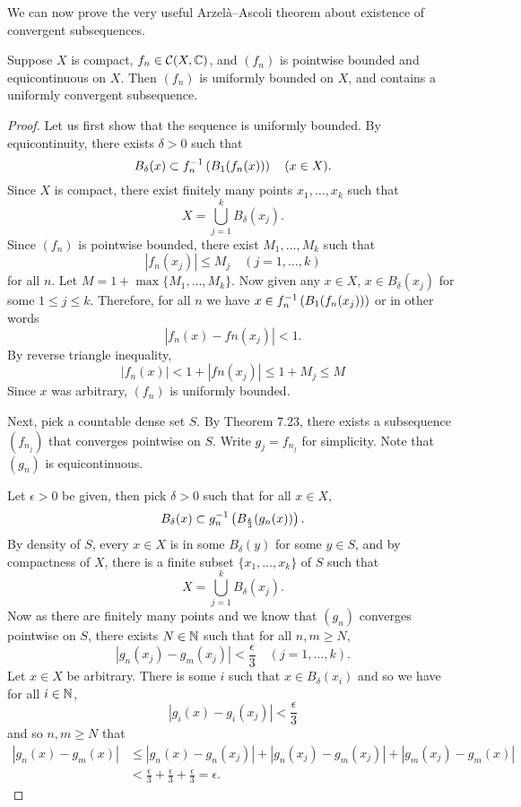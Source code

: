 We can now prove the very useful Arzel\`{a}--Ascoli theorem about existence of convergent subsequences.

\begin{theorem}
Suppose $X$ is compact, $f_n\in\mathcal{C}(X,\mathbb C)$, and $(f_n)$ is pointwise bounded and equicontinuous on $X$. Then $(f_n)$ is uniformly bounded on $X$, and contains a uniformly convergent subsequence.
\end{theorem}

\begin{proof}
Let us first show that the sequence is uniformly bounded. 
By equicontinuity, there exists $\delta>0$ such that
\[B_\delta(x)\subset f_n^{-1}\left(B_1(f_n(x))\right)\quad(x\in X).\]
Since $X$ is compact, there exist finitely many points $x_1,\dots,x_k$ such that
\[X=\bigcup_{j=1}^{k}B_\delta(x_j).\]
Since $(f_n)$ is pointwise bounded, there exist $M_1,\dots,M_k$ such that
\[|f_n(x_j)|\le M_j\quad(j=1,\dots,k)\]
for all $n$. Let $M=1+\max\{M_1,\dots,M_k\}$. Now given any $x\in X$, $x\in B_\delta(x_j)$ for some $1\le j\le k$. Therefore, for all $n$ we have $x\in f_n^{-1}\left(B_1(f_n(x_j))\right)$ or in other words
\[|f_n(x)-fn(x_j)|<1.\]
By reverse triangle inequality,
\[|f_n(x)|<1+|fn(x_j)|\le 1+M_j\le M\]
Since $x$ was arbitrary, $(f_n)$ is uniformly bounded.

Next, pick a countable dense set $S$. By Theorem 7.23, there exists a subsequence $(f_{n_j})$ that converges pointwise on $S$. Write $g_j=f_{n_j}$ for simplicity. Note that $(g_n)$ is equicontinuous.

Let $\epsilon>0$ be given, then pick $\delta>0$ such that for all $x\in X$,
\[B_\delta(x)\subset g_n^{-1}\left(B_\frac{\varepsilon}{3}(g_n(x))\right).\]
By density of $S$, every $x\in X$ is in some $B_\delta(y)$ for some $y\in S$, and by compactness of $X$, there is a finite subset $\{x_1,\dots,x_k\}$ of $S$ such that
\[X=\bigcup_{j=1}^{k}B_\delta(x_j).\]
Now as there are finitely many points and we know that $(g_n)$ converges pointwise on $S$, there exists $N\in\mathbb N$ such that for all $n,m\ge N$,
\[|g_n(x_j)-g_m(x_j)|<\frac{\epsilon}{3}\quad(j=1,\dots,k).\]
Let $x\in X$ be arbitrary. There is some $i$ such that $x\in B_\delta(x_i)$ and so we have for all $i\in\mathbb N$,
\[|g_i(x)-g_i(x_j)|<\frac{\epsilon}{3}\]
and so $n,m\ge N$ that
\begin{align*}
|g_n(x)-g_m(x)|
&\le|g_n(x)-g_n(x_j)|+|g_n(x_j)-g_m(x_j)|+|g_m(x_j)-g_m(x)|\\
&<\frac{\epsilon}{3}+\frac{\epsilon}{3}+\frac{\epsilon}{3}=\epsilon.
\end{align*}
\end{proof}

